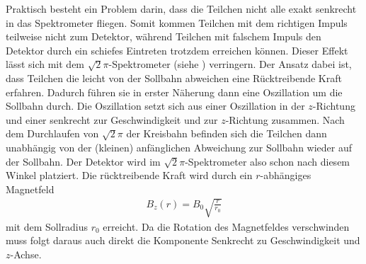 Praktisch besteht ein Problem darin, dass die Teilchen nicht alle exakt senkrecht in das Spektrometer fliegen. Somit kommen Teilchen mit dem richtigen Impuls teilweise nicht zum Detektor, während Teilchen mit falschem Impuls den Detektor durch ein schiefes Eintreten trotzdem erreichen können. Dieser Effekt lässt sich mit dem $\sqrt{2}\pi$-Spektrometer (siehe \cite{MAHLEIN1967229}) verringern. Der Ansatz dabei ist, dass Teilchen die leicht von der Sollbahn abweichen eine Rücktreibende Kraft erfahren. Dadurch führen sie in erster Näherung dann eine Oszillation um die Sollbahn durch. Die Oszillation setzt sich aus einer Oszillation in der $z$-Richtung und einer senkrecht zur Geschwindigkeit und zur $z$-Richtung zusammen. Nach dem Durchlaufen von $\sqrt{2}\pi$ der Kreisbahn befinden sich die Teilchen dann unabhängig von der (kleinen) anfänglichen Abweichung zur Sollbahn wieder auf der Sollbahn. Der Detektor wird im $\sqrt{2}\pi$-Spektrometer also schon nach diesem Winkel platziert. Die rücktreibende Kraft wird durch ein $r$-abhängiges Magnetfeld 
\begin{align*}
  B_z(r)=B_0\sqrt{\frac{r}{r_0}}
\end{align*}
mit dem Sollradius $r_0$ erreicht. Da die Rotation des Magnetfeldes verschwinden muss folgt daraus auch direkt die Komponente Senkrecht zu Geschwindigkeit und $z$-Achse.
